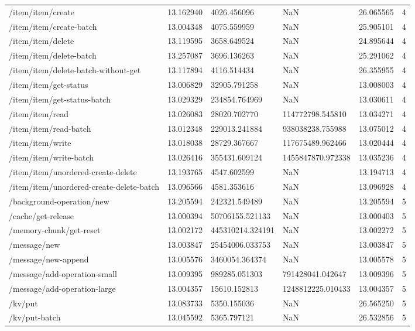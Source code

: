 \begin{tabularx}{\linewidth}{XXXXXX}
/item/item/create & 13.162940 & 4026.456096 & NaN & 26.065565 & 4 \\
/item/item/create-batch & 13.004348 & 4075.559959 & NaN & 25.905101 & 4 \\
/item/item/delete & 13.119595 & 3658.649524 & NaN & 24.895644 & 4 \\
/item/item/delete-batch & 13.257087 & 3696.136263 & NaN & 25.291062 & 4 \\
/item/item/delete-batch-without-get & 13.117894 & 4116.514434 & NaN & 26.355955 & 4 \\
/item/item/get-status & 13.006829 & 32905.791258 & NaN & 13.008003 & 4 \\
/item/item/get-status-batch & 13.029329 & 234854.764969 & NaN & 13.030611 & 4 \\
/item/item/read & 13.026083 & 28020.702770 & 114772798.545810 & 13.034271 & 4 \\
/item/item/read-batch & 13.012348 & 229013.241884 & 938038238.755988 & 13.075012 & 4 \\
/item/item/write & 13.018038 & 28729.367667 & 117675489.962466 & 13.020444 & 4 \\
/item/item/write-batch & 13.026416 & 355431.609124 & 1455847870.972338 & 13.035236 & 4 \\
/item/item/unordered-create-delete & 13.193765 & 4547.602599 & NaN & 13.194713 & 4 \\
/item/item/unordered-create-delete-batch & 13.096566 & 4581.353616 & NaN & 13.096928 & 4 \\
/background-operation/new & 13.205594 & 242321.549489 & NaN & 13.205594 & 5 \\
/cache/get-release & 13.000394 & 50706155.521133 & NaN & 13.000403 & 5 \\
/memory-chunk/get-reset & 13.002172 & 445310214.324191 & NaN & 13.002272 & 5 \\
/message/new & 13.003847 & 25454006.033753 & NaN & 13.003847 & 5 \\
/message/new-append & 13.005576 & 3460054.364374 & NaN & 13.005578 & 5 \\
/message/add-operation-small & 13.009395 & 989285.051303 & 791428041.042647 & 13.009396 & 5 \\
/message/add-operation-large & 13.004357 & 15610.152813 & 1248812225.010433 & 13.004357 & 5 \\
/kv/put & 13.083733 & 5350.155036 & NaN & 26.565250 & 5 \\
/kv/put-batch & 13.045592 & 5365.797121 & NaN & 26.532856 & 5 \\

\end{tabularx}
